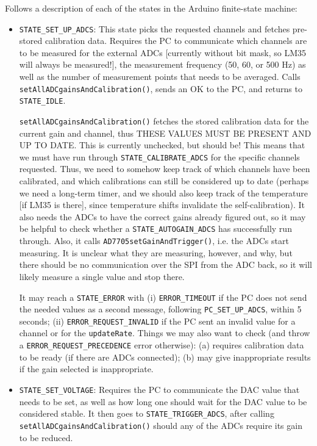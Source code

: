 \documentclass[11pt,a4paper,english]{article}
\begin{document}
\vspace*{\baselineskip}
\noindent{}Follows a description of each of the states in the Arduino finite-state machine:
\begin{itemize}
\item \texttt{STATE\_SET\_UP\_ADCS}: This state picks the requested channels and fetches pre-stored calibration data. Requires the PC to communicate which channels are to be measured for the external ADCs [currently without bit mask, so LM35 will always be measured!], the measurement frequency (50, 60, or 500 Hz) as well as the number of measurement points that needs to be averaged. Calls \texttt{setAllADCgainsAndCalibration()}, sends an OK to the PC, and returns to \texttt{STATE\_IDLE}.

	\texttt{setAllADCgainsAndCalibration()} fetches the stored calibration data for the current gain and channel, thus THESE VALUES MUST BE PRESENT AND UP TO DATE. This is currently unchecked, but should be! This means that we must have run through \texttt{STATE\_CALIBRATE\_ADCS} for the specific channels requested. Thus, we need to somehow keep track of which channels have been calibrated, and which calibrations can still be considered up to date (perhaps we need a long-term timer, and we should also keep track of the temperature [if LM35 is there], since temperature shifts invalidate the self-calibration). It also needs the ADCs to have the correct gains already figured out, so it may be helpful to check whether a \texttt{STATE\_AUTOGAIN\_ADCS} has successfully run through. Also, it calls \texttt{AD7705setGainAndTrigger()}, i.e. the ADCs start measuring. It is unclear what they are measuring, however, and why, but there should be no communication over the SPI from the ADC back, so it will likely measure a single value and stop there.

	It may reach a \texttt{STATE\_ERROR} with (i) \texttt{ERROR\_TIMEOUT} if the PC does not send the needed values as a second message, following \texttt{PC\_SET\_UP\_ADCS}, within 5 seconds; (ii) \texttt{ERROR\_REQUEST\_INVALID} if the PC sent an invalid value for a channel or for the \texttt{updateRate}. Things we may also want to check (and throw a \texttt{ERROR\_REQUEST\_PRECEDENCE} error otherwise): (a) requires calibration data to be ready (if there are ADCs connected); (b) may give inappropriate results if the gain selected is inappropriate.

\item \texttt{STATE\_SET\_VOLTAGE}: Requires the PC to communicate the DAC value that needs to be set, as well as how long one should wait for the DAC value to be considered stable. It then goes to \texttt{STATE\_TRIGGER\_ADCS}, after calling \texttt{setAllADCgainsAndCalibration()} should any of the ADCs require its gain to be reduced.
	

\end{itemize}
\end{document}
